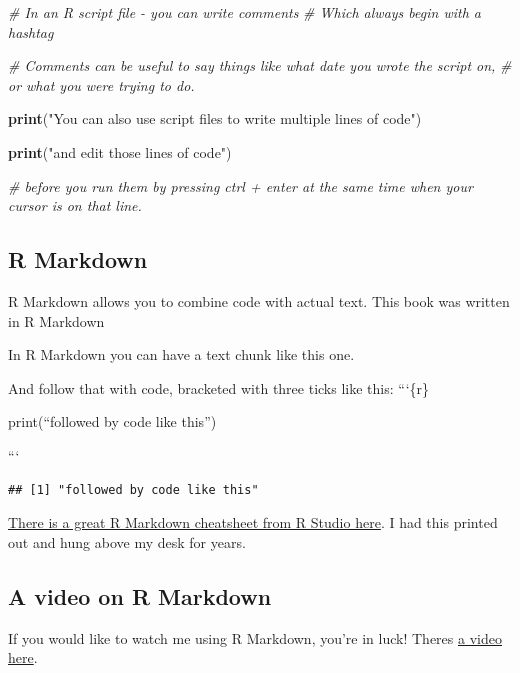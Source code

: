 \documentclass[
]{book}
\newenvironment{Shaded}{\begin{snugshade}}{\end{snugshade}}
\newcommand{\CommentTok}[1]{\textcolor[rgb]{0.56,0.35,0.01}{\textit{#1}}}
\newcommand{\KeywordTok}[1]{\textcolor[rgb]{0.13,0.29,0.53}{\textbf{#1}}}
\newcommand{\NormalTok}[1]{#1}
\newcommand{\StringTok}[1]{\textcolor[rgb]{0.31,0.60,0.02}{#1}}
\begin{document}
\begin{Shaded}
\begin{Highlighting}[]
\CommentTok{# In an R script file - you can write comments}
\CommentTok{# Which always begin with a hashtag}

\CommentTok{# Comments can be useful to say things like what date you wrote the script on,}
\CommentTok{# or what you were trying to do. }

\KeywordTok{print}\NormalTok{(}\StringTok{"You can also use script files to write multiple lines of code"}\NormalTok{)}

\KeywordTok{print}\NormalTok{(}\StringTok{"and edit those lines of code"}\NormalTok{)}


\CommentTok{# before you run them by pressing ctrl + enter at the same time  when your cursor is on that line. }
\end{Highlighting}
\end{Shaded}

\hypertarget{r-markdown}{%
\subsection{R Markdown}\label{r-markdown}}

R Markdown allows you to combine code with actual text. This book was written in R Markdown

In R Markdown you can have a text chunk like this one.

And follow that with code, bracketed with three ticks like this:
```\{r\}

print(``followed by code like this'')

```

\begin{verbatim}
## [1] "followed by code like this"
\end{verbatim}

\href{https://rstudio.com/wp-content/uploads/2015/02/rmarkdown-cheatsheet.pdf}{There is a great R Markdown cheatsheet from R Studio here}. I had this printed out and hung above my desk for years.

\hypertarget{video_rmd}{%
\subsection{A video on R Markdown}\label{video_rmd}}

If you would like to watch me using R Markdown, you're in luck! Theres \href{https://media.ed.ac.uk/media/R+ConversationsA+Intro+to+R+Markdown/1_td0q33v8/112983051}{a video here}.
\end{document}
